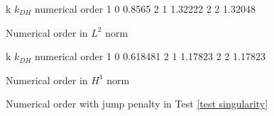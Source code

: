 \begin{table}[h]
\centering
\begin{subtable}[b]{0.45\textwidth}
	\pgfplotstabletypeset
	{
		k $k_{DH}$ {numerical order}
		1 0 0.8565
		2 1 1.32222
		2 2 1.32048
	}
	\caption{Numerical order in $L^2$ norm}
	\end{subtable}
	\begin{subtable}[b]{0.45\textwidth}
	\pgfplotstabletypeset
	{
		k $k_{DH}$ {numerical order}
		1 0 0.618481
		2 1 1.17823
		2 2 1.17823
	}
	\caption{Numerical order in $H^1$ norm}
	\end{subtable}
	\caption{Numerical order with jump penalty in Test \ref{test singularity}}
\label{tab: order jump 3}
\end{table}

